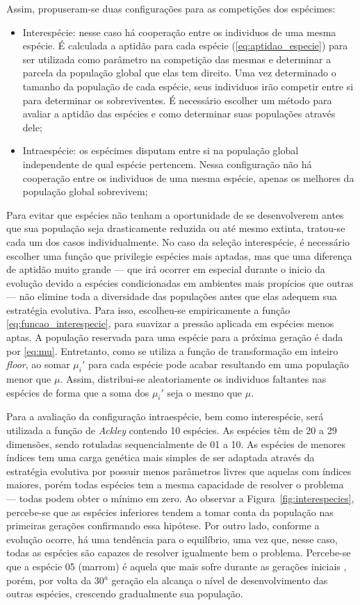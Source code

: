 Assim, propuseram-se duas configurações para as competições dos
espécimes:

\begin{itemize}
\item Interespécie: nesse caso há cooperação entre os individuos de
uma mesma espécie. É calculada a aptidão para cada espécie
(\ref{eq:aptidao_especie}) para ser utilizada como parâmetro na
competição das mesmas e determinar a parcela da população global que
elas tem direito. Uma vez determinado o tamanho da população de cada
espécie, seus individuos irão competir entre si para determinar os
sobreviventes. É necessário escolher um método para avaliar a aptidão
das espécies e como determinar suas populações através dele;
\item Intraespécie: os espécimes disputam entre si na população global
independente de qual espécie pertencem. Nessa configuração não há
cooperação entre os individuos de uma mesma espécie, apenas os
melhores da população global sobrevivem;
\end{itemize}

Para evitar que espécies não tenham a oportunidade de se desenvolverem
antes que sua população seja drasticamente reduzida ou até mesmo
extinta, tratou-se cada um dos casos individualmente. No caso da
seleção interespécie, é necessário escolher uma função que privilegie
espécies mais aptadas, mas que uma diferença de aptidão muito grande
--- que irá ocorrer em especial durante o inicio da evolução devido a
espécies condicionadas em ambientes mais propícios que outras --- não
elimine toda a diversidade das populações antes que elas adequem sua
estratégia evolutiva. Para isso, escolheu-se empiricamente a função
\ref{eq:funcao_interespecie}, para suavizar a pressão aplicada
em espécies menos aptas. A população reservada para uma espécie para a
próxima geração é dada por \ref{eq:mu}. Entretanto, como se utiliza a
função de transformação em inteiro \emph{floor},
ao somar $\mu_i'$ para cada espécie pode acabar resultando em uma
população menor que $\mu$. Assim, distribui-se aleatoriamente os
individuos faltantes nas espécies de forma que a soma dos $\mu_i'$
seja o mesmo que $\mu$. 

Para a avaliação da configuração intraespécie, bem como interespécie,
será utilizada a função de \emph{Ackley} contendo 10 espécies. As
espécies têm de 20 a 29 dimensões, sendo rotuladas sequencialmente de
01 a 10. As espécies de menores índices tem uma carga genética mais
simples de ser adaptada através da estratégia evolutiva por possuir
menos parâmetros livres que aquelas com índices maiores, porém todas
espécies tem a mesma capacidade de resolver o problema --- todas podem
obter o mínimo em zero. Ao observar a Figura~\ref{fig:interespecies},
percebe-se que as espécies inferiores tendem a tomar conta da
população nas primeiras gerações confirmando essa hipótese. Por outro
lado, conforme a evolução ocorre, há uma tendência para o equilíbrio,
uma vez que, nesse caso, todas as espécies são capazes de resolver
igualmente bem o problema. Percebe-se que a espécie 05 (marrom) é
aquela que mais sofre durante as gerações iniciais , porém, por volta
da 30$^a$ geração ela alcança o nível de desenvolvimento das outras
espécies, crescendo gradualmente sua população.

